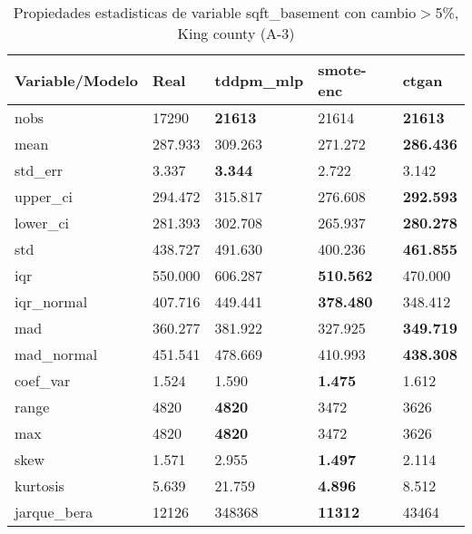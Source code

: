 \begin{table}[H]
\centering
\fontsize{8}{14}\selectfont
\caption{Propiedades estadisticas de variable sqft\_basement con cambio\ensuremath{>}5\%, King county (A-3)}
\label{table-stats-king county-a-3-sqft_basement-short}
\begin{tabular}{|l|m{10em}|m{10em}|m{10em}|m{10em}|}
\hline
 \rowcolor[gray]{0.8}
Variable/Modelo & Real & tddpm\_mlp & smote-enc & ctgan \\
\hline nobs & 17290 & \bfseries 21613 & \cellcolor[rgb]{0.9, 0.54, 0.52} 21614 & \bfseries 21613 \\
\hline mean & 287.933 & \cellcolor[rgb]{0.9, 0.54, 0.52} 309.263 & 271.272 & \bfseries 286.436 \\
\hline std\_err & 3.337 & \bfseries 3.344 & \cellcolor[rgb]{0.9, 0.54, 0.52} 2.722 & 3.142 \\
\hline upper\_ci & 294.472 & \cellcolor[rgb]{0.9, 0.54, 0.52} 315.817 & 276.608 & \bfseries 292.593 \\
\hline lower\_ci & 281.393 & \cellcolor[rgb]{0.9, 0.54, 0.52} 302.708 & 265.937 & \bfseries 280.278 \\
\hline std & 438.727 & \cellcolor[rgb]{0.9, 0.54, 0.52} 491.630 & 400.236 & \bfseries 461.855 \\
\hline iqr & 550.000 & 606.287 & \bfseries 510.562 & \cellcolor[rgb]{0.9, 0.54, 0.52} 470.000 \\
\hline iqr\_normal & 407.716 & 449.441 & \bfseries 378.480 & \cellcolor[rgb]{0.9, 0.54, 0.52} 348.412 \\
\hline mad & 360.277 & 381.922 & \cellcolor[rgb]{0.9, 0.54, 0.52} 327.925 & \bfseries 349.719 \\
\hline mad\_normal & 451.541 & 478.669 & \cellcolor[rgb]{0.9, 0.54, 0.52} 410.993 & \bfseries 438.308 \\
\hline coef\_var & 1.524 & 1.590 & \bfseries 1.475 & \cellcolor[rgb]{0.9, 0.54, 0.52} 1.612 \\
\hline range & 4820 & \bfseries 4820 & \cellcolor[rgb]{0.9, 0.54, 0.52} 3472 & 3626 \\
\hline max & 4820 & \bfseries 4820 & \cellcolor[rgb]{0.9, 0.54, 0.52} 3472 & 3626 \\
\hline skew & 1.571 & \cellcolor[rgb]{0.9, 0.54, 0.52} 2.955 & \bfseries 1.497 & 2.114 \\
\hline kurtosis & 5.639 & \cellcolor[rgb]{0.9, 0.54, 0.52} 21.759 & \bfseries 4.896 & 8.512 \\
\hline jarque\_bera & 12126 & \cellcolor[rgb]{0.9, 0.54, 0.52} 348368 & \bfseries 11312 & 43464 \\

\end{tabular}
\end{table}
